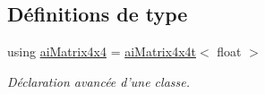 \subsection*{Définitions de type}
\begin{DoxyCompactItemize}
\item 
\hypertarget{group__utilitaire_ga53988236a3db0c0faa5eb1d8aa6a0742}{using \hyperlink{group__utilitaire_ga53988236a3db0c0faa5eb1d8aa6a0742}{ai\-Matrix4x4} = \hyperlink{classai_matrix4x4t}{ai\-Matrix4x4t}$<$ float $>$}\label{group__utilitaire_ga53988236a3db0c0faa5eb1d8aa6a0742}

\begin{DoxyCompactList}\small\item\em Déclaration avancée d'une classe. \end{DoxyCompactList}\end{DoxyCompactItemize}
